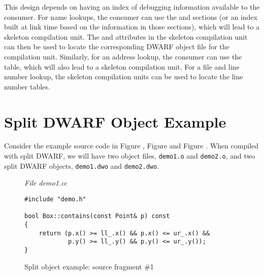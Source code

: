 This design depends on having an index of debugging information
available to the consumer. For name lookups, the consumer can use
the \dotdebugpubnames{} and \dotdebugpubtypes{} sections (or an index
built at link time based on the information in those sections),
which will lead to a skeleton compilation unit. The
\DWATcompdir{} and \DWATdwoname{} attributes in the skeleton
compilation unit can then be used to locate the corresponding
DWARF object file for the compilation unit. Similarly, for an
address lookup, the consumer can use the \dotdebugaranges{} table,
which will also lead to a skeleton compilation unit. For a file
and line number lookup, the skeleton compilation units can be
used to locate the line number tables.

\section{Split DWARF Object Example}
\label{app:splitdwarfobjectexample}
Consider the example source code in 
Figure , 
Figure  and
Figure .
When compiled with split DWARF, we will have two object files,
\texttt{demo1.o} and \texttt{demo2.o}, and two split DWARF objects, 
\texttt{demo1.dwo} and \texttt{demo2.dwo}.

\begin{figure}[b]
\textit{File demo1.cc}
\begin{lstlisting}
#include "demo.h"

bool Box::contains(const Point& p) const
{
    return (p.x() >= ll_.x() && p.x() <= ur_.x() &&
            p.y() >= ll_.y() && p.y() <= ur_.y());
}
\end{lstlisting}
\caption{Split object example: source fragment \#1}
\label{fig:splitobjectexamplesourcefragment1}
\end{figure}

